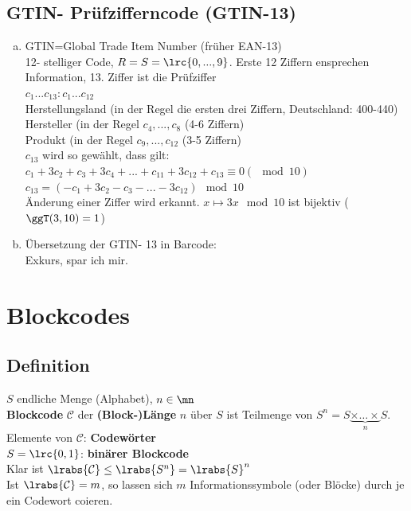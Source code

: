 	\subsection{GTIN- Prüfzifferncode (GTIN-13)}
		\begin{enumerate}[a)]
			\item GTIN=Global Trade Item Number (früher EAN-13)\\
				12- stelliger Code, $R=S=\lrc{0,...,9}$. Erste 12 Ziffern ensprechen
				Information, 13. Ziffer ist die Prüfziffer\\
				$c_1...c_{13}:c_1...c_{12}$\\
				Herstellungsland (in der Regel die ersten drei Ziffern, Deutschland: 400-440)\\
				Hersteller (in der Regel $c_4,...,c_8$ (4-6 Ziffern)\\
				Produkt (in der Regel $c_9,...,c_{12}$ (3-5 Ziffern)\\
				$c_{13}$ wird so gewählt, dass gilt:
				$c_1+3c_2+c_3+3c_4+...+c_{11}+3c_{12}+c_{13}\equiv 0(\mod 10)$\\
				$c_{13}=(-c_1+3c_2-c_3-...-3c_12)\mod 10$\\
				Änderung einer Ziffer wird erkannt. $x\mapsto 3x\mod 10$ ist bijektiv
				($\ggT(3,10)=1$)
			\item Übersetzung der GTIN- 13 in Barcode:\\
				Exkurs, spar ich mir.
		\end{enumerate}

\section{Blockcodes}
	\subsection{Definition}
		$S$ endliche Menge (Alphabet), $n\in\mn$\\
		\textbf{Blockcode} $\mathcal{C}$ der \textbf{(Block-)Länge} $n$ über $S$ ist Teilmenge von $S^n=S\underbrace{\times\dots\times}_{n}S$.\\
		Elemente von $\mathcal{C}$: \textbf{Codewörter}\\
		$S=\lrc{0,1}$: \textbf{binärer Blockcode}\\
		Klar ist $\lrabs{\mathcal{C}}\leq\lrabs{S^n}=\lrabs{S}^n$\\
		Ist $\lrabs{\mathcal{C}}=m$, so lassen sich $m$ Informationssymbole (oder Blöcke) durch je ein Codewort coieren.
	
